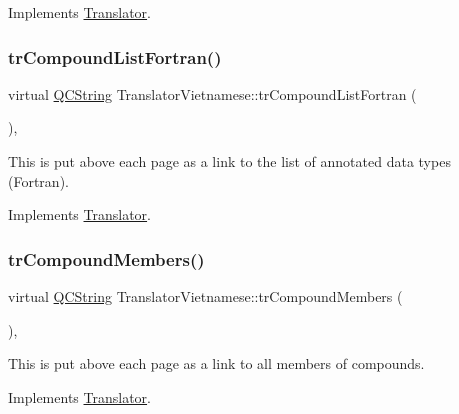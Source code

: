 Implements \mbox{\hyperlink{class_translator}{Translator}}.

\mbox{\label{class_translator_vietnamese_a6df077481654e3d6e831db6dfff0d0cc}} 
\subsubsection{\texorpdfstring{trCompoundListFortran()}{trCompoundListFortran()}}
{\footnotesize\ttfamily virtual \mbox{\hyperlink{class_q_c_string}{Q\+C\+String}} Translator\+Vietnamese\+::tr\+Compound\+List\+Fortran (\begin{DoxyParamCaption}{ }\end{DoxyParamCaption})\hspace{0.3cm}{\ttfamily [inline]}, {\ttfamily [virtual]}}

This is put above each page as a link to the list of annotated data types (Fortran). 

Implements \mbox{\hyperlink{class_translator}{Translator}}.

\mbox{\label{class_translator_vietnamese_a5067963c9fce9876ee22efa663260450}} 
\subsubsection{\texorpdfstring{trCompoundMembers()}{trCompoundMembers()}}
{\footnotesize\ttfamily virtual \mbox{\hyperlink{class_q_c_string}{Q\+C\+String}} Translator\+Vietnamese\+::tr\+Compound\+Members (\begin{DoxyParamCaption}{ }\end{DoxyParamCaption})\hspace{0.3cm}{\ttfamily [inline]}, {\ttfamily [virtual]}}

This is put above each page as a link to all members of compounds. 

Implements \mbox{\hyperlink{class_translator}{Translator}}.

\mbox{\label{class_translator_vietnamese_a5a72f77efcbb97bd51de7622140e0173}} 
